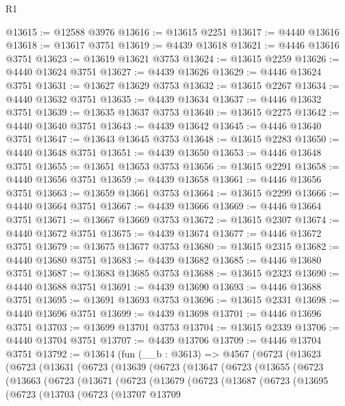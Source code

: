 \begin{lexlean}{R1}
\begin{coremodule}
@13615 := @12588 @3976
@13616 := @13615 @2251
@13617 := @4440 @13616
@13618 := @13617 @3751
@13619 := @4439 @13618
@13621 := @4446 @13616 @3751
@13623 := @13619 @13621 @3753
@13624 := @13615 @2259
@13626 := @4440 @13624 @3751
@13627 := @4439 @13626
@13629 := @4446 @13624 @3751
@13631 := @13627 @13629 @3753
@13632 := @13615 @2267
@13634 := @4440 @13632 @3751
@13635 := @4439 @13634
@13637 := @4446 @13632 @3751
@13639 := @13635 @13637 @3753
@13640 := @13615 @2275
@13642 := @4440 @13640 @3751
@13643 := @4439 @13642
@13645 := @4446 @13640 @3751
@13647 := @13643 @13645 @3753
@13648 := @13615 @2283
@13650 := @4440 @13648 @3751
@13651 := @4439 @13650
@13653 := @4446 @13648 @3751
@13655 := @13651 @13653 @3753
@13656 := @13615 @2291
@13658 := @4440 @13656 @3751
@13659 := @4439 @13658
@13661 := @4446 @13656 @3751
@13663 := @13659 @13661 @3753
@13664 := @13615 @2299
@13666 := @4440 @13664 @3751
@13667 := @4439 @13666
@13669 := @4446 @13664 @3751
@13671 := @13667 @13669 @3753
@13672 := @13615 @2307
@13674 := @4440 @13672 @3751
@13675 := @4439 @13674
@13677 := @4446 @13672 @3751
@13679 := @13675 @13677 @3753
@13680 := @13615 @2315
@13682 := @4440 @13680 @3751
@13683 := @4439 @13682
@13685 := @4446 @13680 @3751
@13687 := @13683 @13685 @3753
@13688 := @13615 @2323
@13690 := @4440 @13688 @3751
@13691 := @4439 @13690
@13693 := @4446 @13688 @3751
@13695 := @13691 @13693 @3753
@13696 := @13615 @2331
@13698 := @4440 @13696 @3751
@13699 := @4439 @13698
@13701 := @4446 @13696 @3751
@13703 := @13699 @13701 @3753
@13704 := @13615 @2339
@13706 := @4440 @13704 @3751
@13707 := @4439 @13706
@13709 := @4446 @13704 @3751
@13792 := @13614
    (fun (__b : @3613) =>
    @4567
      (@6723
        (@13623
          (@6723
            (@13631
              (@6723
                (@13639
                  (@6723
                    (@13647
                      (@6723
                        (@13655
                          (@6723
                            (@13663
                              (@6723
                                (@13671
                                  (@6723
                                    (@13679
                                      (@6723
                                        (@13687
                                          (@6723
                                            (@13695
                                              (@6723
                                                (@13703
                                                  (@6723
                                                    (@13707
                                                      @13709

\end{coremodule}
\end{lexlean}
